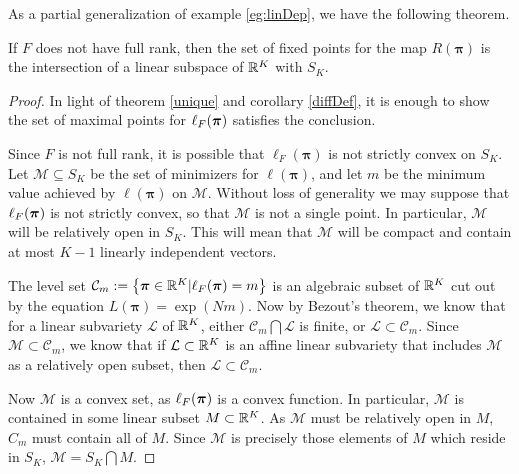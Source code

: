 As a partial generalization of example \ref{eg:linDep}, we have the following theorem.
\begin{thm}\label{thm:linDep}
If $F$ does not have full rank, then the set of fixed points for the map $R(\bm\pi)$ is the intersection of a linear subspace of $\mathbb R^K$ with $S_K$.
\end{thm}
\begin{proof}%
%
In light of theorem \ref{unique} and corollary \ref{diffDef}, it is enough to show the set of maximal points for \( \ell_{F}({\bm\pi}) \) satisfies the conclusion.

Since $F$ is not full rank, it is possible that $\ell_F(\bm\pi)$ is not strictly convex on \( S_K \).  Let $\mathcal{M}\subseteq S_K$ be the set of minimizers for $\ell(\bm\pi)$, and let $m$ be the minimum value achieved by $\ell(\bm\pi)$ on $\mathcal{M}$.  Without loss of generality we may suppose that $\ell_{F}({\bm\pi})$ is not strictly convex, so that $\mathcal{M}$ is not a single point. In particular, \( \mathcal{M} \) will be relatively open in \( S_K \). This will mean that $\mathcal{M}$ will be compact and contain at most \( K-1 \) linearly independent vectors.

The level set $\mathcal{C}_m \mathrel{\mathop{:}}= \left\{\bm\pi\in\mathbb R^K|\ell_{F}({\bm\pi})=m\right\}$ is an algebraic subset of $\mathbb R^{K}$ cut out by the equation $L(\bm\pi)=\exp(Nm)$.  Now by Bezout's theorem, we know that for a linear subvariety $\mathcal{L}$ of $\mathbb R^{K}$, either $\mathcal{C}_m\bigcap\mathcal{L}$ is finite, or $\mathcal{L}\subset\mathcal{C}_m$.  Since $\mathcal{M}\subset\mathcal{C}_m$, we know that if $\mathcal{L}\subset\mathbb R^K$ is an affine linear subvariety that includes $\mathcal{M}$ as a relatively open subset, then $\mathcal{L}\subset\mathcal{C}_m$.


Now $\mathcal{M}$ is a convex set, as $\ell_{F}({\bm\pi})$ is a convex function.  In particular, $\mathcal{M}$ is contained in some linear subset $M\subset\mathbb R^K$.  As $\mathcal{M}$  must be relatively open in \( M \), $C_m$ must contain all of $M$. Since \( \mathcal{M} \) is precisely those elements of \( M \) which reside in \( S_K \), $\mathcal{M}=S_K\bigcap M$.
\end{proof}

